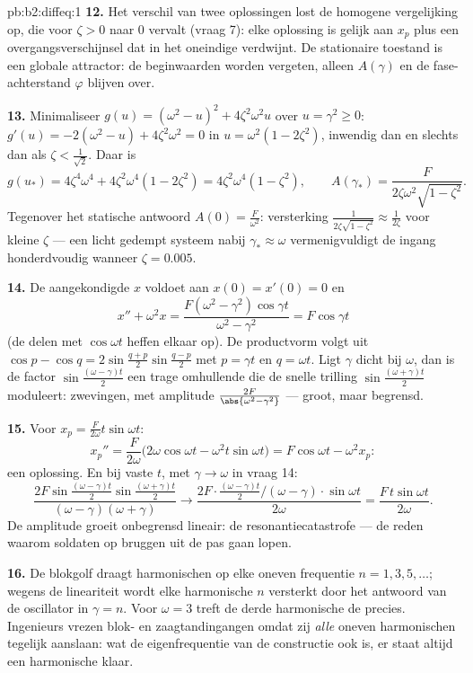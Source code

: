 \begin{solution}{pb:b2:diffeq:1}
\textbf{12.} Het verschil van twee oplossingen lost de homogene
vergelijking op, die voor $\zeta > 0$ naar $0$ vervalt (vraag 7):
elke oplossing is gelijk aan $x_p$ plus een
overgangsverschijnsel dat in het oneindige verdwijnt. De
stationaire toestand is een globale attractor: de beginwaarden
worden vergeten, alleen $A(\gamma)$ en de fase-achterstand
$\varphi$ blijven over.

\textbf{13.} Minimaliseer $g(u) = (\omega^2 - u)^2 +
4\zeta^2\omega^2u$ over $u = \gamma^2 \geq 0$: $g'(u) = -2(\omega^2
- u) + 4\zeta^2\omega^2 = 0$ in $u = \omega^2(1 - 2\zeta^2)$,
inwendig dan en slechts dan als $\zeta < \frac{1}{\sqrt2}$. Daar is
\[
g(u_*) = 4\zeta^4\omega^4 + 4\zeta^2\omega^4(1 - 2\zeta^2)
= 4\zeta^2\omega^4(1 - \zeta^2),
\qquad
A(\gamma_*) = \frac{F}{2\zeta\omega^2\sqrt{1 - \zeta^2}} .
\]
Tegenover het statische antwoord $A(0) = \frac{F}{\omega^2}$:
versterking $\frac{1}{2\zeta\sqrt{1-\zeta^2}} \approx
\frac{1}{2\zeta}$ voor kleine $\zeta$ --- een licht gedempt systeem
nabij $\gamma_* \approx \omega$ vermenigvuldigt de ingang
honderdvoudig wanneer $\zeta = 0.005$.

\textbf{14.} De aangekondigde $x$ voldoet aan $x(0) = x'(0) = 0$ en
\[
x'' + \omega^2 x = \frac{F(\omega^2 -
\gamma^2)\cos\gamma t}{\omega^2 - \gamma^2} = F\cos\gamma t
\]
(de delen met $\cos\omega t$ heffen elkaar op). De productvorm
volgt uit $\cos p - \cos q = 2\sin\frac{q+p}{2}\sin\frac{q-p}2$ met
$p = \gamma t$ en $q = \omega t$. Ligt $\gamma$ dicht bij $\omega$,
dan is de factor $\sin\frac{(\omega-\gamma)t}2$ een trage
omhullende die de snelle trilling $\sin\frac{(\omega+\gamma)t}2$
moduleert: zwevingen, met amplitude
$\frac{2F}{\abs{\omega^2-\gamma^2}}$ --- groot, maar begrensd.

\textbf{15.} Voor $x_p = \frac{F}{2\omega}t\sin\omega t$:
\[
x_p'' = \frac{F}{2\omega}\bigl(2\omega\cos\omega t -
\omega^2t\sin\omega t\bigr)
= F\cos\omega t - \omega^2x_p :
\]
een oplossing. En bij vaste $t$, met $\gamma \to \omega$ in vraag
14:
\[
\frac{2F\sin\frac{(\omega-\gamma)t}2
\sin\frac{(\omega+\gamma)t}{2}}
{(\omega-\gamma)(\omega+\gamma)}
\longrightarrow
\frac{2F\cdot\frac{(\omega-\gamma)t}2\big/(\omega-\gamma)
\cdot\sin\omega t}{2\omega}
= \frac{F\,t\sin\omega t}{2\omega} .
\]
De amplitude groeit onbegrensd lineair: de resonantiecatastrofe ---
de reden waarom soldaten op bruggen uit de pas gaan lopen.

\textbf{16.} De blokgolf draagt harmonischen op elke oneven
frequentie $n = 1, 3, 5, \dots$; wegens de lineariteit wordt elke
harmonische $n$ versterkt door het antwoord van de oscillator in
$\gamma = n$. Voor $\omega = 3$ treft de derde harmonische de
 precies. Ingenieurs vrezen blok- en zaagtandingangen
omdat zij \emph{alle} oneven harmonischen tegelijk aanslaan: wat de
eigenfrequentie van de constructie ook is, er staat altijd een
harmonische klaar.


\end{solution}
